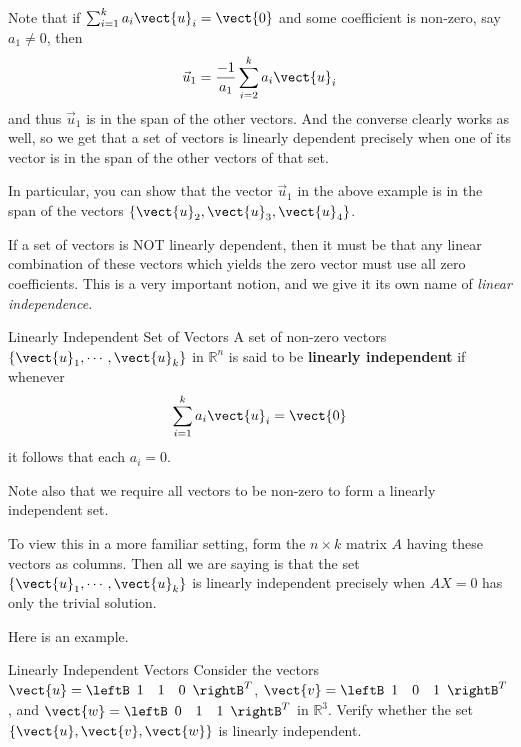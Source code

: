 Note that if $\sum_{i=1}^{k}a_{i}\vect{u}_{i}=\vect{0}$ and some
coefficient is non-zero, say $a_1 \neq 0$, then 
\begin{equation*}
\vec{u}_1 = \frac{-1}{a_1} \sum_{i=2}^{k}a_{i}\vect{u}_{i} 
\end{equation*}
and thus $\vec{u}_1$ is in the span of the other vectors. And the converse clearly works as well,
so we get that a set of vectors is linearly dependent precisely when
one of its vector is in the span of the other vectors of that set.

In particular, you can show that the vector $\vec{u}_1$ in the above
example is in the span of the vectors  $\{ \vect{u}_2, \vect{u}_3, \vect{u}_4 \}$. 

If a set of vectors is NOT linearly dependent, then it must be that
any linear combination of these vectors which yields the zero vector
must use all zero coefficients. This is a very important notion, and we give it its own name of {\em
linear independence}. 

\begin{definition}{Linearly Independent Set of Vectors}\label{def:linearindependent}
A set of non-zero vectors $\{ \vect{u}_1, \cdots ,\vect{u}_k\}$ in $\mathbb{R}^{n}$ is said to be 
\textbf{linearly independent} if whenever 
\begin{equation*}
\sum_{i=1}^{k}a_{i}\vect{u}_{i}=\vect{0}
\end{equation*}
it follows that each $a_{i}=0$.
\end{definition}


Note also that we require all vectors to be non-zero to form a
linearly independent set.

To view this in a more familiar setting, form the $n \times k$ matrix
$A$ having these vectors as columns. Then all we are saying is that
the set $\{ \vect{u}_1, \cdots ,\vect{u}_k\}$ is linearly independent
precisely when $AX=0$ has only the trivial solution.

Here is an example.  

\begin{example}{Linearly Independent Vectors}\label{exa:linearlyindependentvectors}
Consider the vectors $\vect{u}=\leftB 
\begin{array}{rrr}
1  & 1 & 0
\end{array}
\rightB^T$, 
$\vect{v}=\leftB 
\begin{array}{rrr}
1  & 0 & 1
\end{array}
\rightB^T$, and
$\vect{w}=\leftB 
\begin{array}{rrr}
0  & 1 & 1
\end{array}
\rightB^T$ in $\mathbb{R}^{3}$.
Verify whether the set $\{\vect{u}, \vect{v}, \vect{w}\}$ is linearly independent. 
\end{example}

